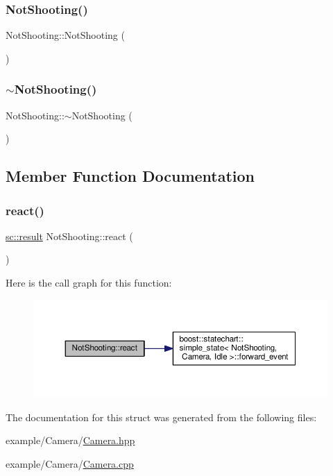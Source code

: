 \subsubsection{\texorpdfstring{Not\+Shooting()}{NotShooting()}}
{\footnotesize\ttfamily Not\+Shooting\+::\+Not\+Shooting (\begin{DoxyParamCaption}{ }\end{DoxyParamCaption})}

\mbox{\label{struct_not_shooting_a8bed91848d90c0a886d0267bb72f79c0}} 
\subsubsection{\texorpdfstring{$\sim$\+Not\+Shooting()}{~NotShooting()}}
{\footnotesize\ttfamily Not\+Shooting\+::$\sim$\+Not\+Shooting (\begin{DoxyParamCaption}{ }\end{DoxyParamCaption})}



\subsection{Member Function Documentation}
\mbox{\label{struct_not_shooting_a5e1f0754f43793e0e1119b9a974f4f0c}} 
\subsubsection{\texorpdfstring{react()}{react()}}
{\footnotesize\ttfamily \mbox{\hyperlink{namespaceboost_1_1statechart_abe807f6598b614d6d87bb951ecd92331}{sc\+::result}} Not\+Shooting\+::react (\begin{DoxyParamCaption}\item[{const \mbox{\hyperlink{struct_ev_shutter_half}{Ev\+Shutter\+Half}} \&}]{ }\end{DoxyParamCaption})}

Here is the call graph for this function\+:
\nopagebreak
\begin{figure}[H]
\begin{center}
\leavevmode
\includegraphics[width=350pt]{struct_not_shooting_a5e1f0754f43793e0e1119b9a974f4f0c_cgraph}
\end{center}
\end{figure}


The documentation for this struct was generated from the following files\+:\begin{DoxyCompactItemize}
\item 
example/\+Camera/\mbox{\hyperlink{_camera_8hpp}{Camera.\+hpp}}\item 
example/\+Camera/\mbox{\hyperlink{_camera_8cpp}{Camera.\+cpp}}\end{DoxyCompactItemize}
